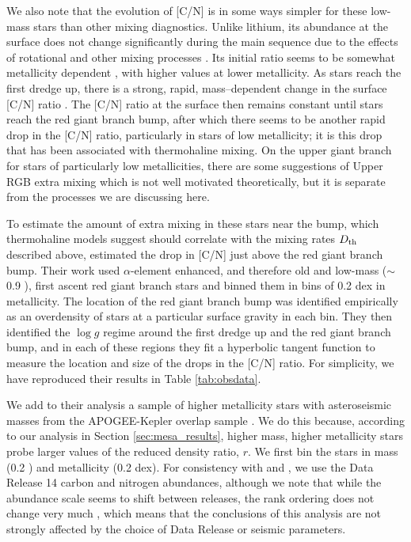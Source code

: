 We also note that the evolution of [C/N] is in some ways simpler for these low-mass stars than other mixing diagnostics. Unlike lithium, its abundance at the surface does not change significantly during the main sequence due to the effects of rotational and other mixing processes \citep{Iben1967}. Its initial ratio seems to be somewhat metallicity dependent \citep{Shetrone2019}%
, with higher values at lower metallicity. As stars reach the first dredge up, there is a strong, rapid, mass--dependent change in the surface [C/N] ratio \citep{MasseronGilmore2015, Martig2016, Ness2016, Spoo2022}. The [C/N] ratio at the surface then remains constant until stars reach the red giant branch bump, after which there seems to be another rapid drop in the [C/N] ratio, particularly in stars of low metallicity; it is this drop that has been associated with thermohaline mixing. On the upper giant branch for stars of particularly low metallicities, there are some suggestions of Upper RGB extra mixing \citep{Shetrone2019} which is not well motivated theoretically, but it is separate from the processes we are discussing here.

To estimate the amount of extra mixing in these stars near the bump, which thermohaline models suggest should correlate with the %
mixing rates $D_\mathrm{th}$ described above, %
\citet{Shetrone2019} estimated the drop in [C/N] just above the red giant branch bump. Their work used $\alpha$-element enhanced, and therefore old and low-mass ($\sim$0.9 \msun), first ascent red giant branch stars and binned them in bins of 0.2 dex in metallicity. The location of the red giant branch bump was identified empirically as an overdensity of stars at a particular surface gravity in each bin. They then identified the %
$\log g$ regime around the first dredge up and the red giant branch bump, and in each of these regions they fit a hyperbolic tangent function to measure the location and size of the drops in the [C/N] ratio. For simplicity, we have reproduced their results in Table \ref{tab:obsdata}. 

We add to their analysis a sample of higher metallicity stars with asteroseismic masses from the APOGEE-Kepler overlap sample \citep[APOKASC,][]{Pinsonneault2014, Pinsonneault2018}. We do this because, according to our analysis in Section \ref{sec:mesa_results}, higher mass, higher metallicity stars probe larger values of the reduced density ratio, $r$. %
We first bin the stars in mass (0.2 \msun) and  metallicity (0.2 dex). For consistency with \citet{Pinsonneault2018} and \citet{Shetrone2019}, we use the Data Release 14 \citet{DR14} carbon and nitrogen abundances, although we note that while the abundance scale seems to shift between releases, the rank ordering does not change very much \citep{Spoo2022}, which means that the conclusions of this analysis are not strongly affected by the choice of Data Release or seismic parameters.

